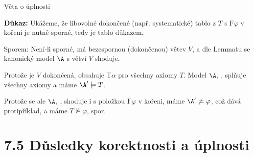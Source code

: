 \documentclass{beamer}
\begin{document}
\begin{frame}{Věta o úplnosti}

    \pause
    
    \smallskip

    \pause
    \textbf{Důkaz:} \pause
    Ukážeme, že libovolné dokončené (např. \alert{systematické}) tablo z $T$ s $\mathrm{F}\varphi$ v kořeni je nutně sporné, tedy je tablo důkazem.
    
    \pause
    Sporem: \alert{Není-li sporné}, má bezespornou (dokončenou) větev $V$, a dle Lemmatu se kanonický model $\A$ s větví $V$ shoduje. 
    
    \pause

    \pause
    Protože je $V$ dokončená, obsahuje $\mathrm{T}\alpha$ pro všechny axiomy $T$. Model $\A$, , splňuje všechny axiomy a máme \alert{$\A'\models T$}. 
    
    \pause
    Protože se ale $\A$, , shoduje i s položkou $\mathrm{F}\varphi$ v kořeni, máme \alert{$\A'\not\models\varphi$}, což dává protipříklad, a máme \alert{$T\not\models\varphi$}, spor.\hfill\qedsymbol

\end{frame}


\section{7.5 Důsledky korektnosti a úplnosti}
\end{document}
